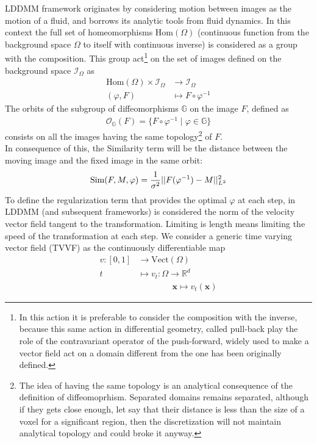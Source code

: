 LDDMM \cite{beg2005computing} framework originates by considering motion between images as the motion of a fluid, and borrows its analytic tools from fluid dynamics. In this context the full set of homeomorphisms $\text{Hom}(\Omega)$ (continuous function from the background space $\Omega$ to itself with continuous inverse) is considered as a group with the composition. This group act\footnote{In this action it is preferable to consider the composition with the inverse, because this same action in differential geometry, called pull-back play the role of the contravariant operator of the push-forward, widely used to make a vector field act on a domain different from the one has been originally defined.} on the set of images defined on the background space $\mathcal{I}_{\Omega}$ as
\begin{align*}
\text{Hom}(\Omega) \times \mathcal{I}_{\Omega} & \longrightarrow  \mathcal{I}_{\Omega}   \\
(\varphi,F) &\longmapsto F\circ \varphi^{-1}
\end{align*}
The orbits of the subgroup of diffeomorphisms $\mathbb{G}$ on the image $F$, defined as
\begin{align*}
\mathcal{O}_{\mathbb{G}}(F) = \{ F\circ \varphi^{-1} \mid \varphi \in \mathbb{G} \}
\end{align*}
consists on all the images having the same topology\footnote{The idea of having the same topology is an analytical consequence of the definition of diffeomoprhism. Separated domains remains separated, although if they gets close enough, let say that their distance is less than the size of a voxel for a significant region, then the discretization will not maintain analytical topology and could broke it anyway.} of $F$.\\
In consequence of this, the Similarity term will be the distance between the moving image and the fixed image in the same orbit:
 \begin{align*}
 \text{Sim}(F,M,\varphi) = \frac{1}{\sigma^2}\vert\lvert F(\varphi^{-1})  - M   \rvert\vert_{L^{2}}^{2}
 \end{align*}
To define the regularization term that provides the optimal $\varphi$ at each step, in LDDMM (and subsequent frameworks) is considered the norm of the velocity vector field tangent to the transformation. Limiting is length means limiting the speed of the transformation at each step.
We consider a generic time varying vector field (TVVF) as the continuously differentiable map 
\begin{align*}
v:[0,1] & \longrightarrow  \text{Vect}(\Omega)\\
t  &\longmapsto  v_{t}  : \Omega \longrightarrow   \mathbb{R}^{d} \\
& \qquad \quad \quad \mathbf{x} \longmapsto v_{t}(\mathbf{x} )
\end{align*}
